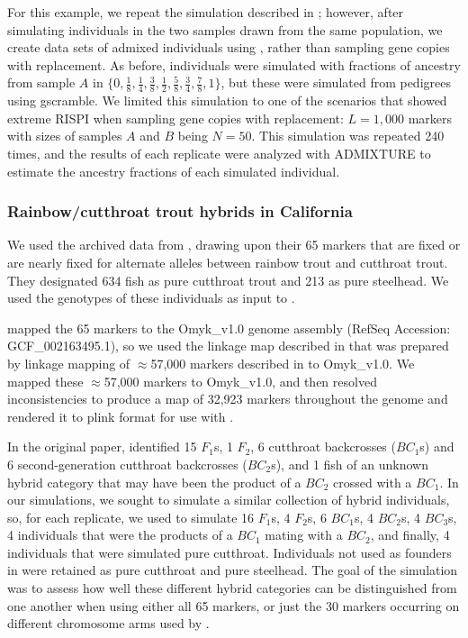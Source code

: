 {For this example, we repeat the simulation described in {\em {}};
however, after simulating individuals in the two samples drawn from the same population,
we create data sets of admixed individuals using \gscramble{}, rather than sampling
gene copies with replacement.  As before, individuals were simulated with fractions of
ancestry from sample $A$ in $\{0, \frac{1}{8}, \frac{1}{4}, \frac{3}{8}, \frac{1}{2}, \frac{5}{8}, \frac{3}{4}, \frac{7}{8}, 1\}$, but these were simulated from pedigrees using gscramble.  We limited
this simulation to one of the scenarios that showed extreme RISPI when sampling gene
copies with replacement: $L=1,000$ markers with sizes of samples $A$ and $B$ being
$N=50$. This simulation was repeated 240 times, and the results of each replicate were analyzed with
ADMIXTURE to estimate the ancestry fractions of each simulated individual.

\subsubsection*{Rainbow/cutthroat trout hybrids in California}

We used the archived data from \citet{rizza2023limited}, drawing upon their 65 markers
that are fixed or are nearly fixed for alternate alleles between rainbow trout and cutthroat trout.
They designated 634 fish as pure cutthroat trout and 213 as pure steelhead.  We used the
genotypes of these individuals as input to \gscramble{}.

\citeauthor{rizza2023limited} mapped the 65 markers to the Omyk\_v1.0 genome assembly (RefSeq 
Accession: GCF\_002163495.1), so we used
the linkage map described in \citep{pearse2019sex} that was prepared by linkage mapping 
of $\approx$57,000 markers described in \citet{palti2015development} to Omyk\_v1.0. We mapped these $\approx$57,000 markers to Omyk\_v1.0, and then resolved inconsistencies to produce a map
of 32,923 markers throughout the genome and rendered it to plink format for use with \gscramble{}.

In the original paper, \citet{rizza2023limited} identified 15 $F_1$s,
1 $F_2$,
6 cutthroat backcrosses ($BC_1$s) and 
6 second-generation cutthroat backcrosses ($BC_2$s),
and 1 fish of an unknown hybrid category that may have been the
product of a $BC_2$ crossed with a $BC_1$.   In our simulations, we sought to simulate
a similar collection of hybrid individuals, so, for each replicate, we used
\gscramble{} to simulate 16 $F_1$s, 4 $F_2$s, 6 $BC_1$s, 4 $BC_2$s, 4 $BC_3$s,  4 individuals
that were the products of a $BC_1$ mating with a $BC_2$, and finally, 4 individuals that were simulated pure cutthroat. Individuals not used as founders
in \gscramble{} were retained as pure cutthroat and pure steelhead.  The goal of the simulation
was to assess how well these different hybrid categories can be distinguished from one another
when using either all 65 markers, or just the 30 markers occurring on different chromosome arms
used by  \citet{rizza2023limited}.

}
